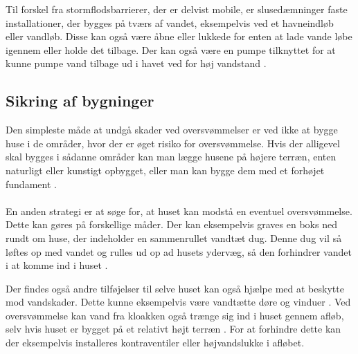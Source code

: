 \par
Til forskel fra stormflodsbarrierer, der er delvist mobile, er slusedæmninger faste installationer, der bygges på tværs af vandet, eksempelvis ved et havneindløb eller vandløb. Disse kan også være åbne eller lukkede for enten at lade vande løbe igennem eller holde det tilbage. Der kan også være en pumpe tilknyttet for at kunne pumpe vand tilbage ud i havet ved for høj vandstand \cite{sluse}. 

\subsection{Sikring af bygninger}
Den simpleste måde at undgå skader ved oversvømmelser er ved ikke at bygge huse i de områder, hvor der er øget risiko for oversvømmelse. Hvis der alligevel skal bygges i sådanne områder kan man lægge husene på højere terræn, enten naturligt eller kunstigt opbygget, eller man kan bygge dem med et forhøjet fundament \cite{planlaegning}. 
\\\\
En anden strategi er at søge for, at huset kan modstå en eventuel oversvømmelse. Dette kan gøres på forskellige måder. Der kan eksempelvis graves en boks ned rundt om huse, der indeholder en sammenrullet vandtæt dug. Denne dug vil så løftes op med vandet og rulles ud op ad husets ydervæg, så den forhindrer vandet i at komme ind i huset \cite{vandtaetdug}. 
\par 
Der findes også andre tilføjelser til selve huset kan også hjælpe med at beskytte mod vandskader. Dette kunne eksempelvis være vandtætte døre og vinduer \cite{barrierekatalog}. Ved oversvømmelse kan vand fra kloakken også trænge sig ind i huset gennem afløb, selv hvis huset er bygget på et relativt højt terræn \cite{stormflodssikring}. For at forhindre dette kan der eksempelvis installeres kontraventiler \cite{planlaegning} eller højvandslukke \cite{forebyg} i afløbet. 

